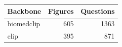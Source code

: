 \begin{tabular}{lrr}
\toprule
Backbone & Figures & Questions \\
\midrule
biomedclip & 605 & 1363 \\
clip & 395 & 871 \\
\bottomrule
\end{tabular}
